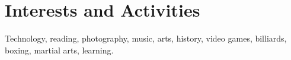 \documentclass[a4paper,10pt]{article} %
\begin{document}

\section{Interests and Activities}

Technology, reading, photography, music, arts,
history, video games, billiards, boxing, martial arts, learning.

\end{document}
